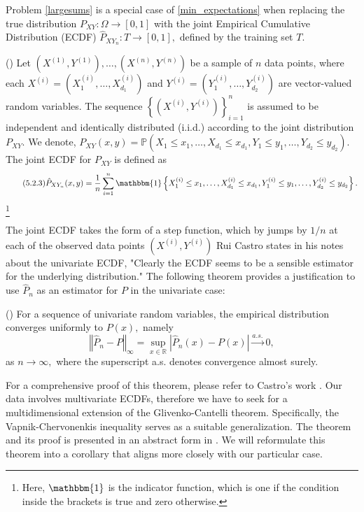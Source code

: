 Problem \eqref{largesums} is a special case of \eqref{min_expectations} when replacing the true distribution $P_{XY}:\Omega\rightarrow[0,1]$ with the joint Empirical Cumulative Distribution (ECDF) $\hat{P}_{XY_{n}}:T\rightarrow[0,1],$ defined by the training set $T.$
\begin{definition}(\cite[1]{CastroNotes})\label{ECDF}
Let $(X^{(1)},Y^{(1)}),\ldots,(X^{(n)},Y^{(n)})$ be a sample of $n$ data points, where each $X^{(i)} = (X^{(i)}_{1},\ldots,X^{(i)}_{d_{1}})$ and $Y^{(i)} = (Y^{(i)}_{1},\ldots,Y^{(i)}_{d_{2}})$ are vector-valued random variables. The sequence $\left\{(X^{(i)},Y^{(i)})\right\}_{i=1}^{n}$ is assumed to be independent and identically distributed (i.i.d.) according to the joint distribution $P_{XY}.$ We denote, $P_{XY}(x,y)=\mathbb{P}\left(X_{1}\leq x_{1},\ldots,X_{d_{1}}\leq x_{d_{1}},Y_{1}\leq y_{1},\ldots,Y_{d_{2}}\leq y_{d_{2}}\right).$ 
The joint ECDF for $P_{XY}$ is defined as
\begin{equation*}\tag{5.2.3}
\hat{P}_{XY_{n}}(x,y) = \frac{1}{n} \sum_{i=1}^{n} \mathbbm{1}\left\{X_{1}^{(i)}\leq x_{1},\ldots,X_{d_{1}}^{(i)}\leq x_{d_{1}},Y_{1}^{(i)}\leq y_{1},\ldots,Y_{d_{2}}^{(i)}\leq y_{d_{2}}\right\}.
\end{equation*}
\footnote{Here, $\mathbbm{1}$ is the indicator function, which is one if the condition inside the brackets is true and zero otherwise.}
\end{definition}
The joint ECDF takes the form of a step function, which by jumps by $1/n$ at each of the observed data points $(X^{(i)}, Y^{(i)})$ Rui Castro states in his notes about the univariate ECDF, "Clearly the ECDF seems to be a sensible estimator for the underlying distribution."\cite{CastroNotes} The following theorem provides a justification to use $\hat{P}_{n}$ as an estimator for $P$ in the univariate case:
\begin{theorem}\textnormal{(\cite[2]{CastroNotes})}\label{Glivenko}
For a sequence of univariate random variables, the empirical distribution converges uniformly to $P(x),$ namely
\begin{equation*}\tag{5.2.4}
\left\Vert \hat{P}_{n} - P\right\Vert_{\infty} = \underset{x\in \mathbb{R}}{\sup}\left|\hat{P}_{n}(x) - P(x)\right|\xrightarrow{a.s.} 0,
\end{equation*}
as $n\rightarrow\infty,$ where the superscript a.s. denotes convergence almost surely.
\end{theorem}
For a comprehensive proof of this theorem, please refer to Castro's work \cite[8]{CastroNotes}. Our data involves multivariate ECDFs, therefore we have to seek for a multidimensional extension of the Glivenko-Cantelli theorem. Specifically, the Vapnik-Chervonenkis inequality serves as a suitable generalization. The theorem and its proof is presented in an abstract form in \cite[4-5]{kahle2006}. We will reformulate this theorem into a corollary that aligns more closely with our particular case. 
